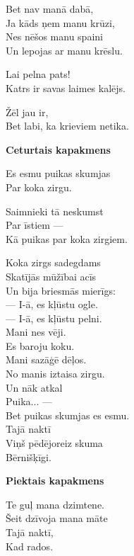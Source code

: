 \documentclass[14pt]{extarticle}
\begin{document}
Bet nav manā dabā,\\
Ja kāds ņem manu krūzi,\\
Nes nēšos manu spaini\\
Un lepojas ar manu krēslu.

Lai pelna pats!\\
Katrs ir savas laimes kalējs.

Žēl jau ir,\\
Bet labi, ka krieviem netika.


\newpage

{\bf Ceturtais kapakmens}

Es esmu puikas skumjas\\
Par koka zirgu.

Saimnieki tā neskumst\\
Par īstiem ---\\
Kā puikas par koka zirgiem.

Koka zirgs sadegdams\\
Skatījās mūžībai acīs\\
Un bija briesmās mierīgs:\\
\mbox{}\hspace{10pt}--- I-ā, es kļūstu ogle.\\
\mbox{}\hspace{10pt}--- I-ā, es kļūstu pelni.\\
\mbox{}\hspace{10pt}Mani nes vēji.\\
\mbox{}\hspace{10pt}Es baroju koku.\\
\mbox{}\hspace{10pt}Mani sazāģē dēļos.\\
\mbox{}\hspace{10pt}No manis iztaisa zirgu.\\
\mbox{}\hspace{10pt}Un nāk atkal\\
\mbox{}\hspace{10pt}Puika... ---\\
Bet puikas skumjas es esmu.\\
Tajā naktī\\
Viņš pēdējoreiz skuma\\
Bērnišķīgi.


\newpage

{\bf Piektais kapakmens}

Te guļ mana dzimtene.\\
Šeit dzīvoja mana māte\\
Tajā naktī,\\
Kad rados.
\end{document}

